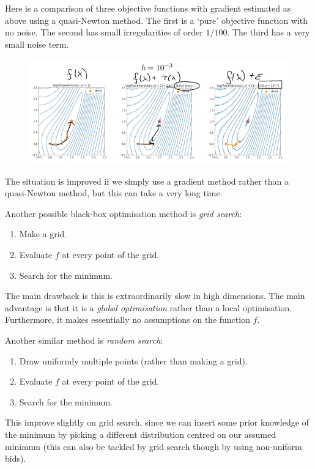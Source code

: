 Here is a comparison of three objective functions with gradient estimated as above using a quasi-Newton method. The first is a `pure' objective function with  no noise. The second has small irregularities of order $1/100$. The third has a very small noise term. 

\begin{figure}[H]
\centering
\includegraphics[scale=0.4]{noisyobjective.png}
\end{figure}

The situation is improved if we simply use a gradient method rather than a quasi-Newton method, but this can take a very long time.



\newpage
Another possible black-box optimisation method is \textit{grid search}:
\begin{enumerate}
\item Make a grid.
\item Evaluate $f$ at every point of the grid.
\item Search for the minimum.
\end{enumerate}
The main drawback is this is extraordinarily slow in high dimensions. The main advantage is that it is a \textit{global optimisation} rather than a local optimisation. Furthermore, it makes essentially no assumptions on the function $f$.

\minirule

Another similar method is \textit{random search}:
\begin{enumerate}
\item Draw uniformly multiple points (rather than making a grid).
\item Evaluate $f$ at every point of the grid.
\item Search for the minimum.
\end{enumerate}
This improve slightly on grid search, since we can insert some prior knowledge of the minimum by picking a different distribution centred on our assumed minimum (this can also be tackled by grid search though by using non-uniform bids).

